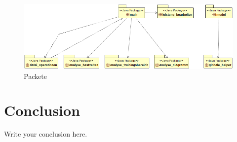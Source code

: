 \documentclass{article}
\begin{document}
\begin{figure}
    \centering
    \includegraphics[width=6.0in]{../_diagrams/packages.png}
    \caption{Packete}
    \label{packages}
\end{figure}


\section{Conclusion}
Write your conclusion here.
\end{document}
